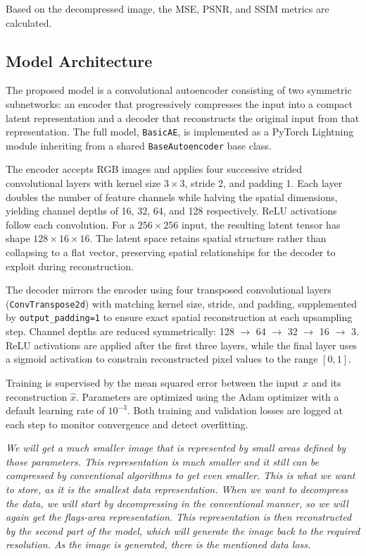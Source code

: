 \documentclass[conference]{IEEEtran}
\begin{document}
Based on the decompressed image, the MSE, PSNR, and SSIM metrics are calculated.

\subsection{Model Architecture}
The proposed model is a convolutional autoencoder consisting of two symmetric subnetworks: an encoder that progressively compresses the input into a compact latent representation and a decoder that reconstructs the original input from that representation. The full model, \texttt{BasicAE}, is implemented as a PyTorch Lightning module inheriting from a shared \texttt{BaseAutoencoder} base class.

The encoder accepts RGB images and applies four successive strided convolutional layers with kernel size $3 \times 3$, stride 2, and padding 1. Each layer doubles the number of feature channels while halving the spatial dimensions, yielding channel depths of 16, 32, 64, and 128 respectively. ReLU activations follow each convolution. For a $256 \times 256$ input, the resulting latent tensor has shape $128 \times 16 \times 16$. The latent space retains spatial structure rather than collapsing to a flat vector, preserving spatial relationships for the decoder to exploit during reconstruction.

The decoder mirrors the encoder using four transposed convolutional layers (\texttt{ConvTranspose2d}) with matching kernel size, stride, and padding, supplemented by \texttt{output\_padding=1} to ensure exact spatial reconstruction at each upsampling step. Channel depths are reduced symmetrically: 128 $\to$ 64 $\to$ 32 $\to$ 16 $\to$ 3. ReLU activations are applied after the first three layers, while the final layer uses a sigmoid activation to constrain reconstructed pixel values to the range $[0, 1]$.

Training is supervised by the mean squared error between the input $x$ and its reconstruction $\hat{x}$.
Parameters are optimized using the Adam optimizer with a default learning rate of $10^{-3}$. Both training and validation losses are logged at each step to monitor convergence and detect overfitting.


{\color{red}\textit{We will get a much smaller image that is represented by small areas defined by those parameters. This representation is much smaller and it still can be compressed by conventional algorithms to get even smaller. This is what we want to store, as it is the smallest data representation. When we want to decompress the data, we will start by decompressing in the conventional manner, so we will again get the flags-area representation. This representation is then reconstructed by the second part of the model, which will generate the image back to the required resolution. As the image is generated, there is the mentioned data loss. 
}}
\end{document}
